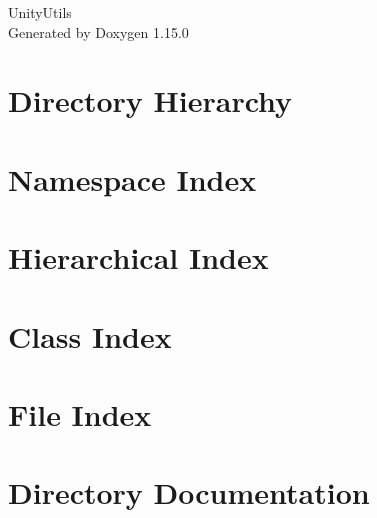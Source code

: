 \documentclass[twoside]{book}
\newcommand{\+}{\discretionary{\mbox{\scriptsize$\hookleftarrow$}}{}{}}
\newcommand{\clearemptydoublepage}{%
    \newpage{\pagestyle{empty}\cleardoublepage}%
  }
\begin{document}
  \raggedbottom
    \hypersetup{pageanchor=false,
                bookmarksnumbered=true,
                pdfencoding=unicode
               }
  \begin{titlepage}
  \vspace*{7cm}
  \begin{center}%
  {\Large Unity\+Utils}\\
  \vspace*{1cm}
  {\large Generated by Doxygen 1.15.0}\\
  \end{center}
  \end{titlepage}
  \clearemptydoublepage
  \tableofcontents
  \clearemptydoublepage
  \hypersetup{pageanchor=true}
\chapter{Directory Hierarchy}

\chapter{Namespace Index}

\chapter{Hierarchical Index}

\chapter{Class Index}

\chapter{File Index}

\chapter{Directory Documentation}











\end{document}
